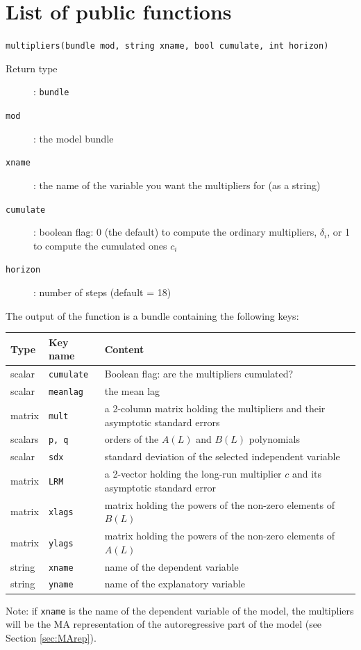 \documentclass[a4paper,10pt]{article}
\newenvironment{funcdoc}[1]
{\noindent\hrulefill\newline\texttt{#1}\par\noindent\hrulefill\par\medskip\par}
{\bigskip}
\begin{document}
\section{List of public functions}
 \label{sec:functions}

\begin{funcdoc}{multipliers(bundle mod, string xname, bool
    cumulate, int horizon)}
  \begin{description}
  \item[Return type]: \texttt{bundle}
  \item[\texttt{mod}]: the model bundle
  \item[\texttt{xname}]: the name of the variable you want the
    multipliers for (as a string)
  \item[\texttt{cumulate}]: boolean flag: 0 (the default) to compute
    the ordinary multipliers, $\delta_i$, or 1 to compute the cumulated
    ones $c_i$
  \item[\texttt{horizon}]: number of steps (default = 18)
\end{description}
%

\noindent The output of the function is a bundle containing the
following keys:

\medskip
\begin{center}
\begin{tabular}{llp{}}
  \hline
  \textbf{Type} & \textbf{Key name} & \textbf{Content} \\
  \hline
  scalar & \texttt{cumulate} & Boolean flag: are the multipliers cumulated? \\
  scalar & \texttt{meanlag} & the mean lag \\
  matrix & \texttt{mult} & a 2-column matrix holding the multipliers
                           and their asymptotic standard errors \\ 
  scalars & \texttt{p, q} & orders of the $A(L)$ and $B(L)$ polynomials \\
  scalar & \texttt{sdx} & standard deviation of the selected
                          independent variable \\
  matrix & \texttt{LRM} & a 2-vector holding the long-run multiplier
                          $c$ and its asymptotic standard error \\ 
  matrix & \texttt{xlags} & matrix holding the powers of the non-zero
                            elements of $B(L)$ \\ 
  matrix & \texttt{ylags} & matrix holding the powers of the non-zero
                            elements of $A(L)$ \\ 
  string & \texttt{xname} & name of the dependent variable \\ 
  string & \texttt{yname} & name of the explanatory variable \\ 
  \hline
\end{tabular}

\end{center}
Note: if \texttt{xname} is the name of the dependent variable of
the model, the multipliers will be the MA representation of the
autoregressive part of the model (see Section \ref{sec:MArep}). 
\end{funcdoc}
\end{document}
